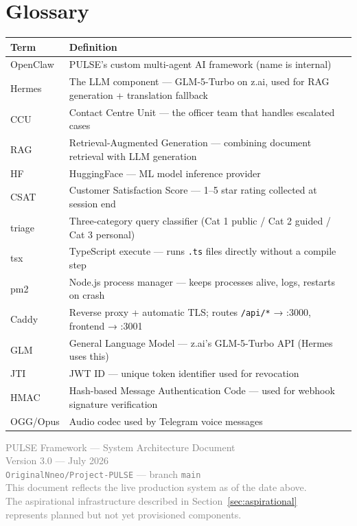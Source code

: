 \documentclass[12pt,a4paper]{article}
\begin{document}
\appendix
\section{Glossary}

\begin{tabular}{@{}lp{11cm}@{}}
\toprule
\textbf{Term} & \textbf{Definition} \\
\midrule
OpenClaw  & PULSE's custom multi-agent AI framework (name is internal) \\
Hermes    & The LLM component — GLM-5-Turbo on z.ai, used for RAG generation + translation fallback \\
CCU       & Contact Centre Unit — the officer team that handles escalated cases \\
RAG       & Retrieval-Augmented Generation — combining document retrieval with LLM generation \\
HF        & HuggingFace — ML model inference provider \\
CSAT      & Customer Satisfaction Score — 1–5 star rating collected at session end \\
triage    & Three-category query classifier (Cat 1 public / Cat 2 guided / Cat 3 personal) \\
tsx       & TypeScript execute — runs \texttt{.ts} files directly without a compile step \\
pm2       & Node.js process manager — keeps processes alive, logs, restarts on crash \\
Caddy     & Reverse proxy + automatic TLS; routes \texttt{/api/*} → :3000, frontend → :3001 \\
GLM       & General Language Model — z.ai's GLM-5-Turbo API (Hermes uses this) \\
JTI       & JWT ID — unique token identifier used for revocation \\
HMAC      & Hash-based Message Authentication Code — used for webhook signature verification \\
OGG/Opus  & Audio codec used by Telegram voice messages \\
\bottomrule
\end{tabular}

\vfill
\begin{center}
\small\textcolor{gray}{
  PULSE Framework — System Architecture Document \\
  Version 3.0 — July 2026 \\
  \texttt{OriginalNneo/Project-PULSE} — branch \texttt{main} \\[4pt]
  This document reflects the live production system as of the date above. \\
  The aspirational infrastructure described in Section~\ref{sec:aspirational} \\
  represents planned but not yet provisioned components.
}
\end{center}
\end{document}
